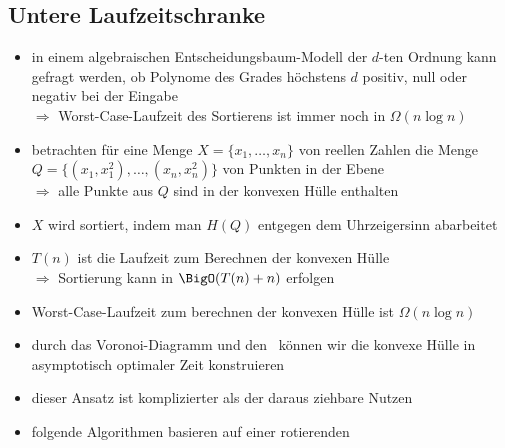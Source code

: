 \subsection{Untere Laufzeitschranke}
\begin{itemize}[itemsep=0pt]
	\item in einem algebraischen Entscheidungsbaum-Modell der $d$-ten Ordnung kann gefragt werden, ob Polynome des Grades höchstens $d$ positiv, null oder negativ bei der Eingabe\\
		$\Rightarrow$ Worst-Case-Laufzeit des Sortierens ist immer noch in $\Omega(n\log n)$
	\item betrachten für eine Menge $X=\{x_1,\dots,x_n\}$ von reellen Zahlen die Menge $Q=\{(x_1,x_1^2),\dots,(x_n,x_n^2)\}$ von Punkten in der Ebene\\
		$\Rightarrow $ alle Punkte aus $Q$ sind in der konvexen Hülle enthalten
	\item $X$ wird sortiert, indem man $H(Q)$ entgegen dem Uhrzeigersinn abarbeitet
	\item $T(n)$ ist die Laufzeit zum Berechnen der konvexen Hülle\\
		$\Rightarrow$ Sortierung kann in $\BigO(T(n)+n)$ erfolgen
	\item Worst-Case-Laufzeit zum berechnen der konvexen Hülle ist $\Omega(n\log n)$
	\item durch das Voronoi-Diagramm und den \dg~können wir die konvexe Hülle in asymptotisch optimaler Zeit konstruieren
	\item dieser Ansatz ist komplizierter als der daraus ziehbare Nutzen
	\item folgende Algorithmen basieren auf einer rotierenden \sweep
\end{itemize}